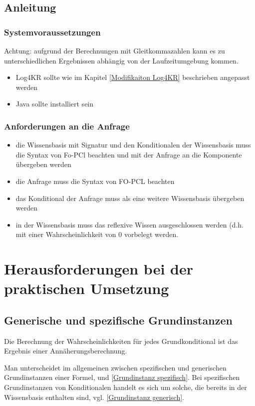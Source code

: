 \documentclass[draft]{scrreprt}
\begin{document}
{\begin{itemize}
\end{itemize}


\section{Anleitung}
\subsection{Systemvoraussetzungen}
Achtung: aufgrund der Berechnungen mit Gleitkommazahlen kann es zu unterschiedlichen Ergebnissen abhängig von der Laufzeitumgebung kommen. 
\begin{itemize}
	\item Log4KR sollte wie im Kapitel \ref{Modifikaiton Log4KR} beschrieben angepasst werden
	\item Java sollte installiert sein
\end{itemize}
\subsection{Anforderungen an die Anfrage}
\begin{itemize}
	\item die Wissensbasis mit Signatur und den Konditionalen der Wissensbasis muss die Syntax von Fo-PCl beachten und mit der Anfrage an die Komponente übergeben werden
	\item die Anfrage muss die Syntax von FO-PCL beachten
	\item das Konditional der Anfrage muss als eine weitere Wissensbasis übergeben werden
	\item in der Wissensbasis muss das reflexive Wissen ausgeschlossen werden (d.h. mit einer Wahrscheinlichkeit von 0 vorbelegt werden. 
\end{itemize}

\chapter{Herausforderungen bei der praktischen Umsetzung} \label{Herausforderungen}
\section{Generische und spezifische Grundinstanzen}
Die Berechnung der Wahrscheinlichkeiten für jedes Grundkonditional ist das Ergebnis einer Annäherungsberechnung.

Man unterscheidet im allgemeinen zwischen spezifischen und generischen Grundinstanzen einer Formel,   und \ref{Grundinstanz spezifisch}.
Bei spezifischen Grundinstanzen von Konditionalen handelt es sich um solche, die bereits in der Wissensbasis enthalten sind, vgl. \ref{Grundinstanz generisch}. 

}
\end{document}
